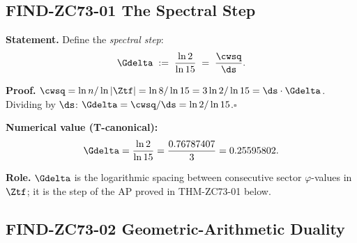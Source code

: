 \documentclass[12pt, a4paper]{article}
\begin{document}
\subsection{FIND-ZC73-01 \quad The Spectral Step}
\label{sec:find01}

\begin{derivedbox}[title={FIND-ZC73-01: $\Gdelta = \cwsq/\ds
  = \ln2/\ln15$ ($R_0$, Exact)}]
\textbf{Statement.}
Define the \emph{spectral step}:
\[
  \Gdelta \;:=\; \frac{\ln 2}{\ln 15} \;=\; \frac{\cwsq}{\ds}.
\]

\textbf{Proof.}
$\cwsq = \ln n/\ln|\Ztf| = \ln 8/\ln 15 = 3\ln 2/\ln 15 = \ds\cdot\Gdelta$.
Dividing by $\ds$: $\Gdelta = \cwsq/\ds = \ln2/\ln15$.\hfill$\square$

\textbf{Numerical value (T-canonical):}
\[
  \Gdelta = \frac{\ln 2}{\ln 15} = \frac{0.76787407}{3} = 0.25595802.
\]

\textbf{Role.}
$\Gdelta$ is the logarithmic spacing between consecutive sector
$\varphi$-values in $\Ztf$; it is the step of the AP proved in
THM-ZC73-01 below.
\end{derivedbox}

\subsection{FIND-ZC73-02 \quad Geometric-Arithmetic Duality}
\label{sec:find02}
\end{document}
